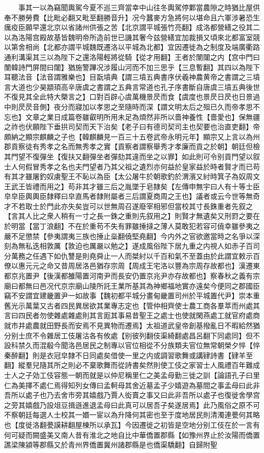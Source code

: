 　　事其一以為竊聞輿駕今夏不巡三齊當幸中山往冬輿駕停鄴當農隙之時猶比屋供奉不勝勞費【比毗必翻又毗至翻勝音升】况今蠶麥方急將何以堪命且六軍涉暑恐生癘疫臣願早還北京以省諸州供張之苦【北京謂平城張竹亮翻】成洛都營繕之役其二以為洛陽宫殿故基皆魏明帝所造前世已譏其奢今兹營繕宜加裁損又頃來北都富室競以第舍相尚【北都亦謂平城魏既遷洛以平城為北都】宜因遷徙為之制度及端廣衢路通利溝渠其三以為陛下之還洛陽輕將從騎【從才用翻】王者於闈闥之内【宫中門曰闈韓詩門屏間曰闥】猶施警蹕况涉履山河而不加三思乎【三息暫翻】其四以為陛下耳聽法音【法音謂雅樂也】目翫墳典【謂三墳五典書序伏羲神農黄帝之書謂之三墳言大道也少昊顓頊高辛唐虞之書謂之五典言常道也孔子序書斷自唐虞三墳五典後世不復見其全此特大槩言之】口對百辟心虞萬機景昃而食【虞度也景昃日昃也日景過中則昃昃音側】夜分而寢加以孝思之至隨時而深【謂文明太后之殂已久而帝孝思不忘也】文章之業日成篇卷雖叡明所用未足為煩然非所以嗇神養性【嗇愛也】保無疆之祚也伏願陛下垂拱司契而天下治矣【老子曰有德司契司主也契要也治直吏翻】帝頗納之顯宗麒麟之子也【韓麒麟見一百三十五卷武帝永明元年】顯宗又上言以為州郡貢察徒有秀孝之名而無秀孝之實【貢察者謂察舉秀才孝廉而貢之於朝】朝廷但檢其門望不復彈坐【復扶又翻彈坐者彈劾其違而坐之以罪】如此則可令别貢門望以叙士人何假冒秀孝之名也夫門望者乃其父祖之遺烈亦何益於皇家益於時者賢才而已苟有其才雖屠釣奴虜聖王不恥以為臣【太公屠牛於朝歌釣於渭濱又紂時箕子為奴周文王武王皆禮而用之】苟非其才雖三后之胤墜于皂隸矣【左傳申無宇曰人有十等士臣皁皁臣輿輿臣隸釋曰皁直馬者隸附屬者三后謂夏商周之王也】議者或云今世等無奇才不若取士於門此亦失矣豈可以世無周召遂廢宰相邪但當校其寸長銖重者先叙之【言其人比之衆人稍有一寸之長一銖之重則先叙用之】則賢才無遺矣又刑罸之要在於明當【當丁浪翻】不在於重苟不失有罪雖捶撻之薄人莫敢犯若容可僥幸雖參夷之嚴不足懲禁【參夷謂夷三族也捶止橤翻僥堅堯翻】今内外之官欲邀當時之名爭以深刻為無私迭相敦厲【敦迫也厲嚴以勉之】遂成風俗陛下居九重之内視人如赤子百司分萬務之任遇下如仇讐是則堯舜止一人而桀紂以千百和氣不至蓋由於此謂宜敕示百僚以惠元元之命又昔周居洛邑猶存宗周【周成王宅洛以豐為宗周存故都也】漢遷東都京兆置尹【後漢都雒陽置河南尹而長安仍置京兆尹亦存故都也】察春秋之義有宗廟曰都無曰邑况代京宗廟山陵所託王業所基其為神鄉福地實亦遠矣今便同之郡國臣竊不安謂宜建畿置尹一如故事【魏初都平城分畫甸畿置司州於平城置代尹】崇本重舊光示萬葉又古者四民異居欲其業專志定也【管仲相齊使士農工商各羣萃而州處其言曰四民者勿使雜處雜處則其言厖其事易昔聖王之處士也使就閑燕處工就官府處商就市井處農就田野長而安焉不見異物而遷焉】太祖道武皇帝創基撥亂日不暇給然猶分别士庶不令雜居工伎屠沽各有攸處【别彼列翻伎渠綺翻處昌呂翻下同處同】但不設科禁久而混殽今聞洛邑居民之制專以官位相從不分族類夫官位無常朝榮夕悴【悴秦醉翻】則是衣冠皁隸不日同處矣借使一里之内或調習歌舞或講肄詩書【肄羊至翻】縱羣兒隨其所之則必不棄歌舞而從詩書矣然則使工伎之家習士人風禮百年難成士人之子効工伎容態一朝而就是以仲尼稱里仁之美孟母勤三徙之訓【論語孔子曰里仁為美擇不處仁焉得知列女傳曰孟軻母其舍近墓孟子少嬉遊為墓間之事孟母曰此非吾所以處子也乃去舍市旁其嬉戲乃賈人衒賣之事又曰此非吾所以處子也復徙舍學宫之旁其嬉戲乃設俎豆揖遜進退孟母曰此真可以居吾子矣遂居焉】此乃風俗之原不可不察朝廷每選人士校其一㛰一宦以為升降何其密也至于度地居民則清濁連甍何其略也【度徙洛翻甍謨耕翻屋棟所以承瓦】今因遷徙之初皆是空地分别工伎在於一言有何可疑而闕盛美又南人昔有淮北之地自比中華僑置郡縣【如豫州界止於汝陽而僑置譙梁陳潁等郡縣又於青州界僑置冀州諸郡縣是也僑渠驕翻】自歸附聖